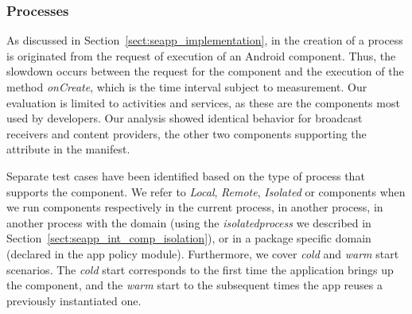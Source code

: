 \subsubsection{Processes}

As discussed in Section~\ref{sect:seapp_implementation}, in \pap the
creation of a process is originated from the request of execution of
an Android component.  Thus, the slowdown occurs between the request
for the component and the execution of the method \textit{onCreate},
which is the time interval subject to measurement.  Our evaluation is
limited to activities and services, as these are the components most
used by developers.  Our analysis showed identical behavior for
broadcast receivers and content providers, the other two components
supporting the \process attribute in the manifest.

Separate test cases have been identified based on the type of process
that supports the component.  We refer to \emph{Local}, \emph{Remote},
\emph{Isolated} or \emph{\pap} components when we run components
respectively in the current process, in another process, in another
process with the \isolatedapp domain (using the {\em isolatedprocess}
we described in Section~\ref{sect:seapp_int_comp_isolation}), or in a
package specific domain (declared in the app policy module).
Furthermore, we cover \emph{cold} and \emph{warm} start scenarios.
The {\em cold} start corresponds to the first time the application
brings up the component, and the {\em warm} start to the subsequent
times the app reuses a previously instantiated one.


